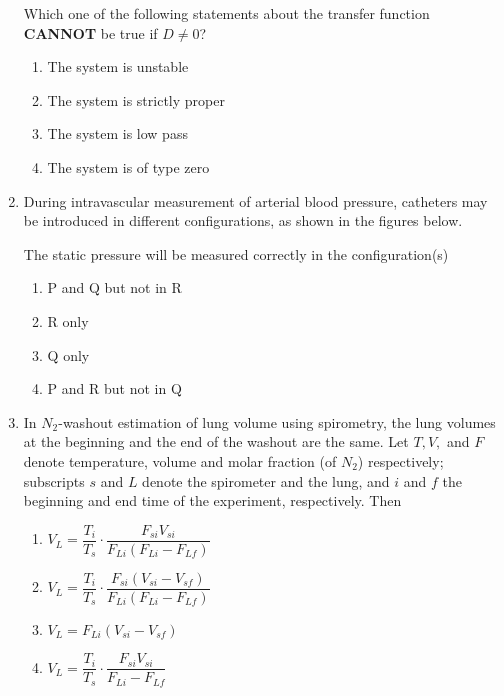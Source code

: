\documentclass[journal]{IEEEtran}
\begin{document}
\begin{enumerate}
Which one of the following statements about the transfer function \textbf{CANNOT} be true if $D \neq 0$?
\begin{multicols}{2}
\begin{enumerate}
\item The system is unstable  
\item The system is strictly proper  
\item The system is low pass  
\item The system is of type zero  
\end{enumerate}
\end{multicols}


\item During intravascular measurement of arterial blood pressure, catheters may be introduced in different configurations, as shown in the figures below.  

The static pressure will be measured correctly in the configuration(s)
\begin{multicols}{4}
\begin{enumerate}
\item P and Q but not in R  
\item R only  
\item Q only  
\item P and R but not in Q  
\end{enumerate}
\end{multicols}

\item In $N_2$-washout estimation of lung volume using spirometry, the lung volumes at the beginning and the end of the washout are the same. Let $T, V,$ and $F$ denote temperature, volume and molar fraction (of $N_2$) respectively; subscripts $s$ and $L$ denote the spirometer and the lung, and $i$ and $f$ the beginning and end time of the experiment, respectively. Then  
\begin{multicols}{2}
\begin{enumerate}
\item $V_L = \dfrac{T_i}{T_s} \cdot \dfrac{F_{si} V_{si}}{F_{Li}(F_{Li}-F_{Lf})}$  
\item $V_L = \dfrac{T_i}{T_s} \cdot \dfrac{F_{si}(V_{si}-V_{sf})}{F_{Li}(F_{Li}-F_{Lf})}$  
\item $V_L = F_{Li}(V_{si}-V_{sf})$  
\item $V_L = \dfrac{T_i}{T_s} \cdot \dfrac{F_{si} V_{si}}{F_{Li}-F_{Lf}}$  
\end{enumerate}
\end{multicols}



\end{enumerate}
\end{document}
